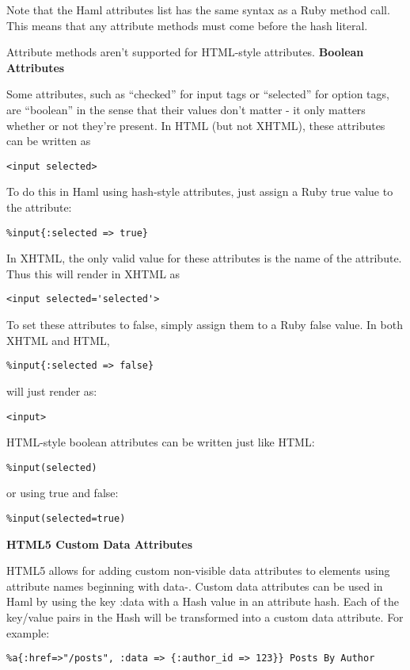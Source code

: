 \documentclass[10pt]{article}
\begin{document}
 Note that the Haml attributes list has the same syntax as a Ruby method call. This means that any attribute methods must come before the hash literal.


 Attribute methods aren’t supported for HTML-style attributes.
\textbf{Boolean Attributes}


 Some attributes, such as “checked” for input tags or “selected” for option tags, are “boolean” in the sense that their values don’t matter - it only matters whether or not they’re present. In HTML (but not XHTML), these attributes can be written as
\begin{verbatim}
<input selected>
\end{verbatim}


 To do this in Haml using hash-style attributes, just assign a Ruby true value to the attribute:
\begin{verbatim}
%input{:selected => true}
\end{verbatim}


 In XHTML, the only valid value for these attributes is the name of the attribute. Thus this will render in XHTML as
\begin{verbatim}
<input selected='selected'>
\end{verbatim}


 To set these attributes to false, simply assign them to a Ruby false value. In both XHTML and HTML,
\begin{verbatim}
%input{:selected => false}
\end{verbatim}


 will just render as:
\begin{verbatim}
<input>
\end{verbatim}


 HTML-style boolean attributes can be written just like HTML:
\begin{verbatim}
%input(selected)
\end{verbatim}


 or using true and false:
\begin{verbatim}
%input(selected=true)
\end{verbatim}
\textbf{HTML5 Custom Data Attributes}


 HTML5 allows for adding custom non-visible data attributes to elements using attribute names beginning with data-. Custom data attributes can be used in Haml by using the key :data with a Hash value in an attribute hash. Each of the key/value pairs in the Hash will be transformed into a custom data attribute. For example:
\begin{verbatim}
%a{:href=>"/posts", :data => {:author_id => 123}} Posts By Author
\end{verbatim}
\end{document}
